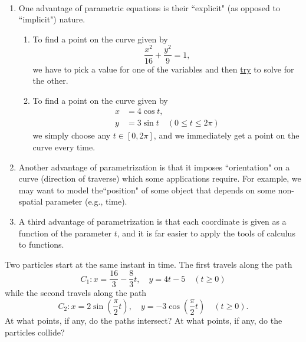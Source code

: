 \begin{remark}\,
\begin{enumerate}
\item One advantage of parametric equations is their ``explicit" (as opposed to ``implicit") nature.
\begin{enumerate}
\item To find a point on the curve given by 
\begin{equation*}
\frac{x^2}{16}+\frac{y^2}{9}=1,
\end{equation*}
we have to pick a value for one of the variables and then \underline{try} to solve for the other.
\item To find a point on the curve given by
\begin{align*}
x &=  4\cos t,\\
y &=  3\sin t\quad (0\le t\le 2\pi)
\end{align*}
we simply choose any $t\in [0,2\pi]$, and we immediately get a point on the curve every time.
\end{enumerate}
\item Another advantage of parametrization is that it imposes ``orientation" on a curve (direction of traverse) which some applications require.
For example, we may want to model the``position" of some object that depends on some non-spatial parameter (e.g., time).
\item A third advantage of parametrization is that each coordinate is given as a function of the parameter $t$, and it is far easier to apply the tools of calculus to functions.
\end{enumerate}
\end{remark}

\newpage

\begin{example}
Two particles start at the same instant in time.
The first travels along the path 
\begin{equation*}
C_1: x = \frac{16}{3}-\frac{8}{3}t,\quad y = 4t-5 \quad (t\ge 0)
\end{equation*}
while the second travels along the path 
\begin{equation*}
C_2: x = 2\sin\left(\frac{\pi}{2}t\right),\quad y = -3\cos\left(\frac{\pi}{2}t\right) \quad (t\ge 0).
\end{equation*}
At what points, if any, do the paths intersect?  At what points, if any, do the particles collide?
\end{example}

\newpage

